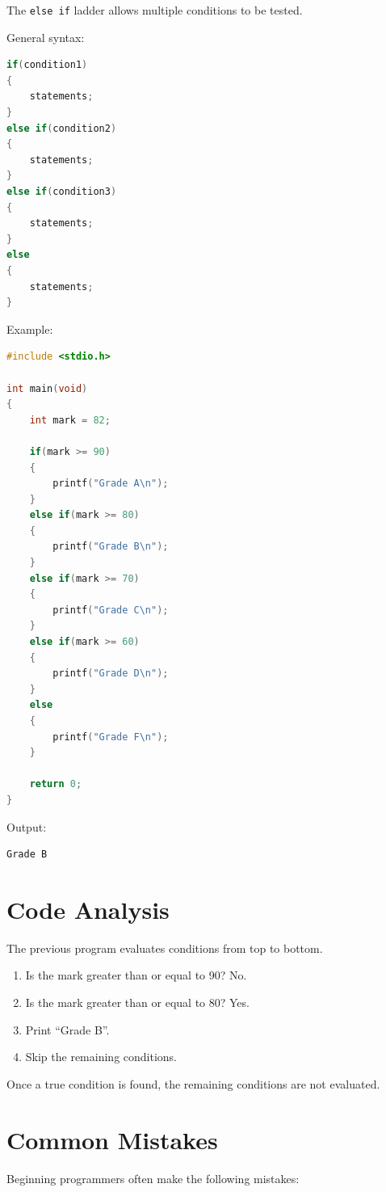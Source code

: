 \documentclass[12pt,openany]{book}
\begin{document}
The \texttt{else if} ladder allows multiple conditions to be tested.

General syntax:

\begin{lstlisting}[language=C]
if(condition1)
{
    statements;
}
else if(condition2)
{
    statements;
}
else if(condition3)
{
    statements;
}
else
{
    statements;
}
\end{lstlisting}

Example:

\begin{lstlisting}[language=C]
#include <stdio.h>

int main(void)
{
    int mark = 82;

    if(mark >= 90)
    {
        printf("Grade A\n");
    }
    else if(mark >= 80)
    {
        printf("Grade B\n");
    }
    else if(mark >= 70)
    {
        printf("Grade C\n");
    }
    else if(mark >= 60)
    {
        printf("Grade D\n");
    }
    else
    {
        printf("Grade F\n");
    }

    return 0;
}
\end{lstlisting}

Output:

\begin{lstlisting}
Grade B
\end{lstlisting}

\section{Code Analysis}

The previous program evaluates conditions from top to bottom.

\begin{enumerate}
    \item Is the mark greater than or equal to 90? No.
    \item Is the mark greater than or equal to 80? Yes.
    \item Print ``Grade B''.
    \item Skip the remaining conditions.
\end{enumerate}

Once a true condition is found, the remaining conditions are not evaluated.

\section{Common Mistakes}

Beginning programmers often make the following mistakes:
\end{document}
